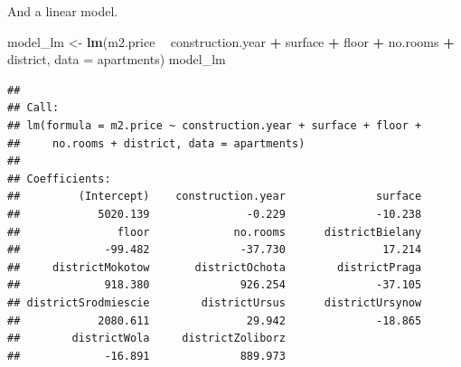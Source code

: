 \documentclass[]{krantz}
\newenvironment{Shaded}{\begin{snugshade}}{\end{snugshade}}
\newcommand{\DataTypeTok}[1]{\textcolor[rgb]{0.13,0.29,0.53}{#1}}
\newcommand{\KeywordTok}[1]{\textcolor[rgb]{0.13,0.29,0.53}{\textbf{#1}}}
\newcommand{\NormalTok}[1]{#1}
\newcommand{\OperatorTok}[1]{\textcolor[rgb]{0.81,0.36,0.00}{\textbf{#1}}}
\newcommand{\StringTok}[1]{\textcolor[rgb]{0.31,0.60,0.02}{#1}}
\theoremstyle{definition}
\theoremstyle{definition}
\theoremstyle{definition}
\theoremstyle{remark}
\begin{document}
And a linear model.

\begin{Shaded}
\begin{Highlighting}[]
\NormalTok{model_lm <-}\StringTok{ }\KeywordTok{lm}\NormalTok{(m2.price }\OperatorTok{~}\StringTok{ }\NormalTok{construction.year }\OperatorTok{+}\StringTok{ }\NormalTok{surface }\OperatorTok{+}\StringTok{ }\NormalTok{floor }\OperatorTok{+}\StringTok{ }\NormalTok{no.rooms }\OperatorTok{+}\StringTok{ }\NormalTok{district, }\DataTypeTok{data =}\NormalTok{ apartments)}
\NormalTok{model_lm}
\end{Highlighting}
\end{Shaded}

\begin{verbatim}
## 
## Call:
## lm(formula = m2.price ~ construction.year + surface + floor + 
##     no.rooms + district, data = apartments)
## 
## Coefficients:
##         (Intercept)    construction.year              surface  
##            5020.139               -0.229              -10.238  
##               floor             no.rooms      districtBielany  
##             -99.482              -37.730               17.214  
##     districtMokotow       districtOchota        districtPraga  
##             918.380              926.254              -37.105  
## districtSrodmiescie        districtUrsus      districtUrsynow  
##            2080.611               29.942              -18.865  
##        districtWola     districtZoliborz  
##             -16.891              889.973
\end{verbatim}


\end{document}
